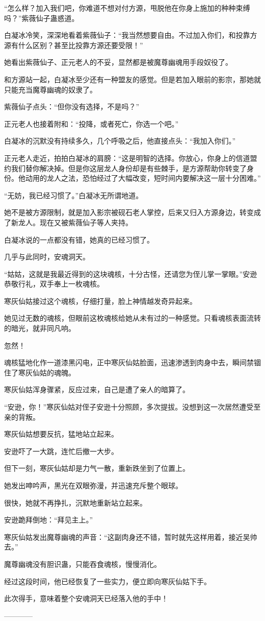 \begin{this_body}
“怎么样？加入我们吧，你难道不想对付方源，甩脱他在你身上施加的种种束缚吗？”紫薇仙子蛊惑道。

白凝冰冷笑，深深地看着紫薇仙子：“我当然想要自由。不过加入你们，和投靠方源有什么区别？甚至比投靠方源还要受限！”

她看出紫薇仙子、正元老人的不妥，显然都是被魔尊幽魂用手段奴役了。

和方源站一起，白凝冰至少还有一种盟友的感觉。但是若加入眼前的影宗，那她就只能充当魔尊幽魂的奴隶了。

紫薇仙子点头：“但你没有选择，不是吗？”

正元老人也接着附和：“投降，或者死亡，你选一个吧。”

白凝冰的沉默没有持续多久，几个呼吸之后，他直接点头：“我加入你们。”

正元老人走近，拍拍白凝冰的肩膀：“这是明智的选择。你放心，你身上的信道盟约我们替你解决掉。但是你这层龙人身份却是有些棘手，是方源帮助你转变了身份。他动用的龙人之法，恐怕经过了大幅改变，短时间内要解决这一层十分困难。”

“无妨，我已经习惯了。”白凝冰无所谓地道。

她不是被方源限制，就是加入影宗被砚石老人掌控，后来又归入方源身边，转变成了新龙人。现在又被紫薇仙子等人夹持。

白凝冰说的一点都没有错，她真的已经习惯了。

几乎与此同时，安魂洞天。

“姑姑，这就是我最近得到的这块魂核，十分古怪，还请您为侄儿掌一掌眼。”安逊恭敬行礼，双手奉上一枚魂核。

寒灰仙姑接过这个魂核，仔细打量，脸上神情越发奇异起来。

她见过无数的魂核，但眼前这枚魂核给她从未有过的一种感觉。只看魂核表面流转的暗光，就非同凡响。

忽然！

魂核猛地化作一道漆黑闪电，正中寒灰仙姑脸面，迅速渗透到肉身中去，瞬间禁锢住了寒灰仙姑的魂魄。

寒灰仙姑浑身骤紧，反应过来，自己是遭了亲人的暗算了。

“安逊，你！”寒灰仙姑对侄子安逊十分照顾，多次提拔。没想到这一次居然遭受至亲的背叛。

寒灰仙姑想要反抗，猛地站立起来。

安逊吓了一大跳，连忙后撤一大步。

但下一刻，寒灰仙姑却是力气一散，重新跌坐到了位置上。

她发出呻吟声，黑光在双眼弥漫，并迅速充斥整个眼球。

很快，她就不再挣扎，沉默地重新站立起来。

安逊跪拜倒地：“拜见主上。”

寒灰仙姑发出魔尊幽魂的声音：“这副肉身还不错，暂时就先这样用着，接近吴帅去。”

魔尊幽魂没有胆识蛊，只能吞食魂核，慢慢消化。

经过这段时间，他已经恢复了一些实力，便立即向寒灰仙姑下手。

此次得手，意味着整个安魂洞天已经落入他的手中！

------------

\end{this_body}

